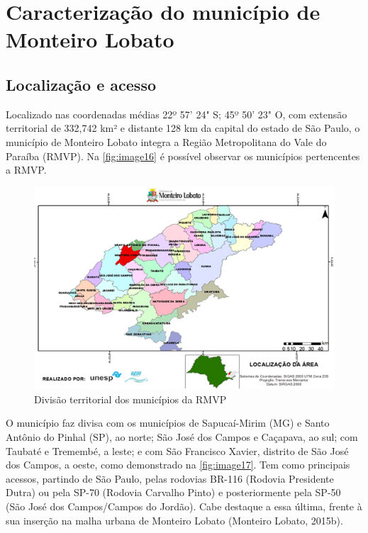 \section{Caracterização do município de Monteiro Lobato}

\subsection{Localização e acesso}

Localizado nas coordenadas médias 22º 57' 24" S; 45º 50' 23" O, com extensão territorial de 332,742 km² e distante 128 km da capital do estado de São Paulo, o município de Monteiro Lobato integra a Região Metropolitana do Vale do Paraíba (RMVP). Na \autoref{fig:image16} é possível observar os municípios pertencentes a RMVP.

\begin{figure}[h!]
	\centering
	\includegraphics[width=1\linewidth]{produtos/proddois/image16}
	\caption{Divisão territorial dos municípios da RMVP}
	\label{fig:image16}
\end{figure}

O município faz divisa com os municípios de Sapucaí-Mirim (MG) e Santo Antônio do Pinhal (SP), ao norte; São José dos Campos e Caçapava, ao sul; com Taubaté e Tremembé, a leste; e com São Francisco Xavier, distrito de São José dos Campos, a oeste, como demonstrado na \autoref{fig:image17}. Tem como principais acessos, partindo de São Paulo, pelas rodovias BR-116 (Rodovia Presidente Dutra) ou pela SP-70 (Rodovia Carvalho Pinto) e posteriormente pela SP-50 (São José dos Campos/Campos do Jordão). Cabe destaque a essa última, frente à sua inserção na malha urbana de Monteiro Lobato (Monteiro Lobato, 2015b).

